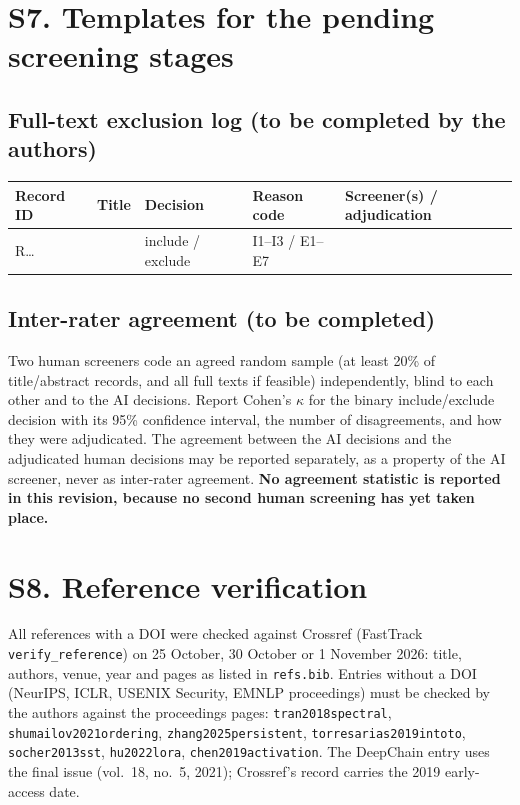 \documentclass[10pt,a4paper]{article}
\begin{document}
\section{S7. Templates for the pending screening stages}
\subsection*{Full-text exclusion log (to be completed by the authors)}
\begin{tabular}{p{1.6cm}p{5cm}p{1.6cm}p{2.2cm}p{3cm}}\toprule Record ID & Title & Decision & Reason code & Screener(s) / adjudication\\\midrule
R\ldots & & include / exclude & I1--I3 / E1--E7 & \\\bottomrule\end{tabular}
\subsection*{Inter-rater agreement (to be completed)}
Two human screeners code an agreed random sample (at least 20\% of title/abstract records, and all full texts if feasible) independently, blind to each other and to the AI decisions. Report Cohen's $\kappa$ for the binary include/exclude decision with its 95\% confidence interval, the number of disagreements, and how they were adjudicated. The agreement between the AI decisions and the adjudicated human decisions may be reported separately, as a property of the AI screener, never as inter-rater agreement. \textbf{No agreement statistic is reported in this revision, because no second human screening has yet taken place.}
\section{S8. Reference verification}
All references with a DOI were checked against Crossref (FastTrack \texttt{verify\_reference}) on 25 October, 30 October or 1 November 2026: title, authors, venue, year and pages as listed in \texttt{refs.bib}. Entries without a DOI (NeurIPS, ICLR, USENIX Security, EMNLP proceedings) must be checked by the authors against the proceedings pages: \texttt{tran2018spectral}, \texttt{shumailov2021ordering}, \texttt{zhang2025persistent}, \texttt{torresarias2019intoto}, \texttt{socher2013sst}, \texttt{hu2022lora}, \texttt{chen2019activation}. The DeepChain entry uses the final issue (vol.\ 18, no.\ 5, 2021); Crossref's record carries the 2019 early-access date.
\end{document}

